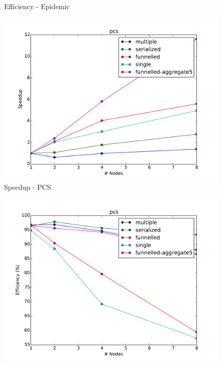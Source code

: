 \documentclass[11pt]{book}
\begin{document}
\begin{figure}
\begin{minipage}{.5\textwidth}
\begin{center}
      Efficiency - Epidemic \\
    \end{center}
  \end{minipage}
  \begin{minipage}{.5\textwidth}
    \begin{center}
      \includegraphics[width=\textwidth,keepaspectratio,quiet]{figs/partitioning_communication/communication_pcs_speedup.pdf} \\
      Speedup - PCS \\
    \end{center}
  \end{minipage}%
  \hfill
  \begin{minipage}{.5\textwidth}
    \begin{center}
      \includegraphics[width=\textwidth,keepaspectratio,quiet]{figs/partitioning_communication/communication_pcs_efficiency.pdf} \\

\end{center}
\end{minipage}
\end{figure}
\end{document}
